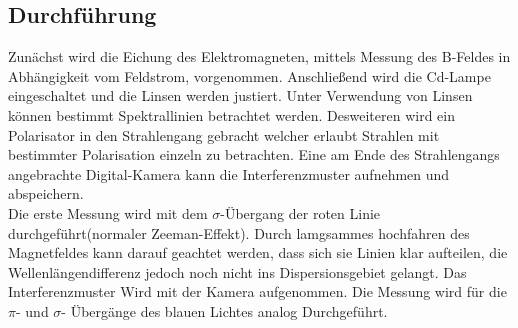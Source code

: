 \subsection{Durchführung}
Zunächst wird die Eichung des Elektromagneten, mittels Messung des B-Feldes in Abhängigkeit vom Feldstrom, vorgenommen.
Anschließend wird die Cd-Lampe eingeschaltet und die Linsen werden justiert.
Unter Verwendung von Linsen können bestimmt Spektrallinien betrachtet werden.
Desweiteren wird ein Polarisator in den Strahlengang gebracht welcher erlaubt Strahlen mit bestimmter Polarisation einzeln zu betrachten.
Eine am Ende des Strahlengangs angebrachte Digital-Kamera kann die Interferenzmuster aufnehmen und abspeichern.\\

Die erste Messung wird mit dem $\sigma$-Übergang der roten Linie durchgeführt(normaler Zeeman-Effekt).
Durch lamgsammes hochfahren des Magnetfeldes kann darauf geachtet werden, dass sich sie Linien klar aufteilen, die Wellenlängendifferenz jedoch noch nicht ins Dispersionsgebiet gelangt.
Das Interferenzmuster Wird mit der Kamera aufgenommen.
Die Messung wird für die $\pi$- und $\sigma$- Übergänge des blauen Lichtes analog Durchgeführt.
